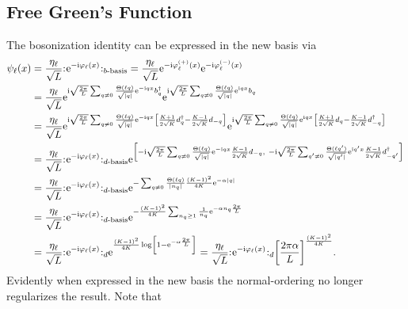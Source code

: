 \documentclass[english, parskip=full]{scrartcl}
\begin{document}
\subsection{Free Green's Function}
The bosonization identity can be expressed in the new basis via
\begin{align}
\psi_\ell(x) &= \frac{\eta_\ell}{\sqrt{L}} \normord{\powe{-\i\varphi_\ell(x)}}_{b\text{-basis}} = \frac{\eta_\ell}{\sqrt{L}} \powe{-\i \varphi_\ell^{(+)}(x)} \powe{-\i \varphi_\ell^{(-)}(x)} \\
&= \frac{\eta_\ell}{\sqrt{L}} \powe{\i \sqrt{\frac{2\pi}{L}} \sum_{q\neq 0} \frac{\Theta(\ell q)}{\sqrt{|q|}} \powe{-\i qx} b_q^\dagger } \powe{\i \sqrt{\frac{2\pi}{L}} \sum_{q\neq 0} \frac{\Theta(\ell q)}{\sqrt{|q|}} \powe{\i qx} b_q}\\
&= \frac{\eta_\ell}{\sqrt{L}} \powe{\i \sqrt{\frac{2\pi}{L}} \sum_{q\neq 0} \frac{\Theta(\ell q)}{\sqrt{|q|}} \powe{-\i qx} \klb*{\frac{K+1}{2\sqrt{K}} d_q^\dagger - \frac{K-1}{2\sqrt{K}}d_{-q}} } \powe{\i \sqrt{\frac{2\pi}{L}} \sum_{q\neq 0} \frac{\Theta(\ell q)}{\sqrt{|q|}} \powe{\i qx} \klb*{\frac{K+1}{2\sqrt{K}} d_q - \frac{K-1}{2\sqrt{K}}d_{-q}^\dagger}}\\
&= \frac{\eta_\ell}{\sqrt{L}} \normord{\powe{-\i\varphi_\ell(x)}}_{d\text{-basis}}\powe{\klb*{-\i \sqrt{\frac{2\pi}{L}} \sum_{q\neq 0} \frac{\Theta(\ell q)}{\sqrt{|q|}} \powe{-\i qx} \frac{K-1}{2\sqrt{K}}d_{-q},\  -\i \sqrt{\frac{2\pi}{L}}\sum_{q'\neq 0} \frac{\Theta(\ell q')}{\sqrt{|q'|}} \powe{\i q'x} \frac{K-1}{2\sqrt{K}}d_{-q'}^\dagger}}\\
&= \frac{\eta_\ell}{\sqrt{L}} \normord{\powe{-\i\varphi_\ell(x)}}_{d\text{-basis}} \powe{-\sum_{q\neq 0} \frac{\Theta(\ell q)}{|n_q|} \frac{(K-1)^2}{4K} \powe{-\alpha |q|}}\\
&= \frac{\eta_\ell}{\sqrt{L}} \normord{\powe{-\i\varphi_\ell(x)}}_{d\text{-basis}} \powe{- \frac{(K-1)^2}{4K} \sum_{n_q\ge 1} \frac{1}{n_q} \powe{-\alpha n_q \frac{2\pi}{L}}} \\
&= \frac{\eta_\ell}{\sqrt{L}} \normord{\powe{-\i\varphi_\ell(x)}}_{d} \powe{\frac{(K-1)^2}{4K} \log\klb*{1 - \powe{-\alpha \frac{2\pi}{L}}}} = \frac{\eta_\ell}{\sqrt{L}} \normord{\powe{-\i\varphi_\ell(x)}}_{d} \klb*{\frac{2\pi\alpha}{L}}^\frac{(K-1)^2}{4K}.
\end{align}
Evidently when expressed in the new basis the normal-ordering no longer regularizes the result.
Note that
\end{document}
